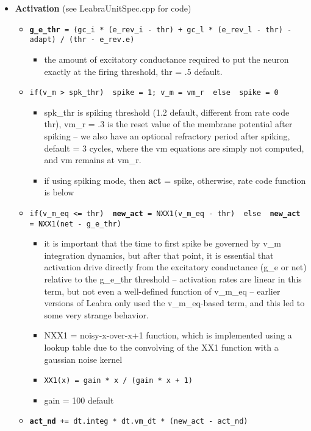 \begin{itemize}
\item {\bf Activation} (see LeabraUnitSpec.cpp for code)
  \begin{itemize}
  \item {\tt {\bf g\_e\_thr} = (gc\_i * (e\_rev\_i - thr) + gc\_l * (e\_rev\_l - thr) - adapt) / (thr - e\_rev.e)}
    \begin{itemize}
    \item the amount of excitatory conductance required to put the neuron exactly at the firing threshold, thr = .5 default.
    \end{itemize}
  \item {\tt if(v\_m > spk\_thr) { spike = 1; v\_m = vm\_r } else { spike = 0 }}
    \begin{itemize}
    \item spk\_thr is spiking threshold (1.2 default, different from rate code thr), vm\_r = .3 is the reset value of the membrane potential after spiking -- we also have an optional refractory period after spiking, default = 3 cycles, where the vm equations are simply not computed, and vm remains at vm\_r.
    \item if using spiking mode, then {\bf act} = spike, otherwise, rate code function is below
    \end{itemize}
  \item {\tt if(v\_m\_eq <= thr) { {\bf new\_act} = NXX1(v\_m\_eq - thr) } else { {\bf new\_act} = NXX1(net - g\_e\_thr) }}
    \begin{itemize}
    \item it is important that the time to first spike be governed by v\_m integration dynamics, but after that point, it is essential that activation drive directly from the excitatory conductance (g\_e or net) relative to the g\_e\_thr threshold -- activation rates are linear in this term, but not even a well-defined function of v\_m\_eq -- earlier versions of Leabra only used the v\_m\_eq-based term, and this led to some very strange behavior.
    \item NXX1 = noisy-x-over-x+1 function, which is implemented using a lookup table due to the convolving of the XX1 function with a gaussian noise kernel
    \item {\tt XX1(x) = gain * x / (gain * x + 1)}
    \item gain = 100 default
    \end{itemize}
  \item {\tt {\bf act\_nd} += dt.integ * dt.vm\_dt * (new\_act - act\_nd)}
    \begin{itemize}

\end{itemize}
\end{itemize}
\end{itemize}

